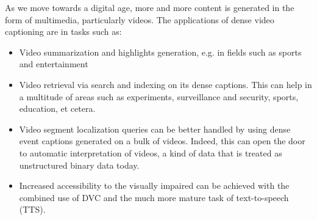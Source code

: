 \par As we move towards a digital age, more and more content is generated in the form of multimedia, particularly videos. The applications of dense video captioning are in tasks such as:

\begin{itemize}
	\item Video summarization and highlights generation, e.g. in fields such as sports and entertainment
	\item Video retrieval via search and indexing on its dense captions. This can help in a multitude of areas such as experiments, surveillance and security, sports, education, et cetera.
	\item Video segment localization queries can be better handled by using dense event captions generated on a bulk of videos. Indeed, this can open the door to automatic interpretation of videos, a kind of data that is treated as unstructured binary data today.
	\item Increased accessibility to the visually impaired can be achieved with the combined use of DVC and the much more mature task of text-to-speech (TTS).
\end{itemize}
